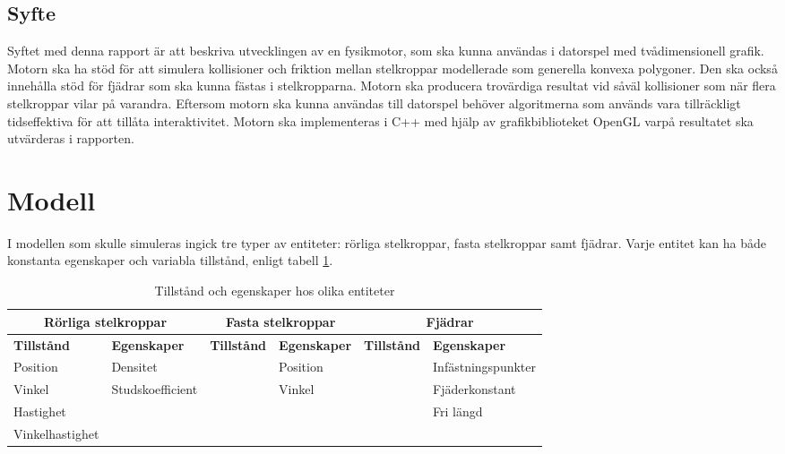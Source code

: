 \documentclass[a4paper,12pt,twopage,swedish]{article}
\begin{document}
\subsection{Syfte}
Syftet med denna rapport är att beskriva utvecklingen av en fysikmotor, som ska kunna användas i datorspel med tvådimensionell grafik. Motorn ska ha stöd för att simulera kollisioner och friktion mellan stelkroppar modellerade som generella konvexa polygoner. Den ska också innehålla stöd för fjädrar som ska kunna fästas i stelkropparna. Motorn ska producera trovärdiga resultat vid såväl kollisioner som när flera stelkroppar vilar på varandra. Eftersom motorn ska kunna användas till datorspel behöver algoritmerna som används vara tillräckligt tidseffektiva för att tillåta interaktivitet. Motorn ska implementeras i C++ med hjälp av grafikbiblioteket OpenGL varpå resultatet ska utvärderas i rapporten.


\section{Modell}
I modellen som skulle simuleras ingick tre typer av entiteter: rörliga stelkroppar, fasta stelkroppar samt fjädrar. Varje entitet kan ha både konstanta egenskaper och variabla tillstånd, enligt tabell \ref{table:states_and_properties}.

\begin{table}[!h]
	\caption{Tillstånd och egenskaper hos olika entiteter}
	\label{table:states_and_properties}
	\renewcommand{\arraystretch}{1.5}
	\begin{tabular}{|p{2.2cm}|p{2.3cm}|p{2.2cm}|p{2.3cm}|p{2.2cm}|p{2.3cm}|}
		\hline
			\multicolumn{2}{|c|}{\textbf{Rörliga stelkroppar}} & \multicolumn{2}{|c|}{\textbf{Fasta stelkroppar}} & \multicolumn{2}{|c|}{\textbf{Fjädrar}} \\
		\hline
			\textbf{Tillstånd} & \textbf{Egenskaper} & \textbf{Tillstånd} & \textbf{Egenskaper} & \textbf{Tillstånd} & \textbf{Egenskaper} \\
		\hline
			Position & Densitet & & Position & & Infästnings\-punkter \\
			Vinkel & Studs\-koefficient & & Vinkel & & Fjäder\-konstant \\
			Hastighet & & & & & Fri längd \\
			Vinkel\-hastighet & & & & & {} \\
		\hline
	\end{tabular}
\end{table}
\end{document}
